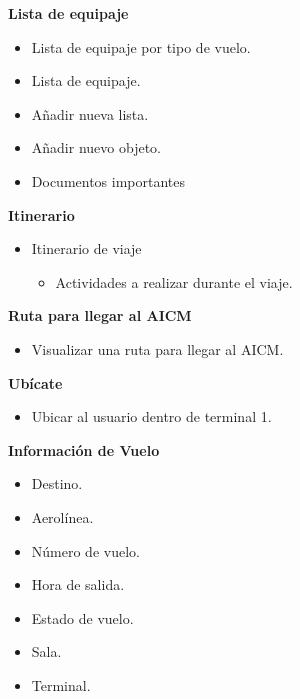 \textbf{Lista de equipaje}

\begin{itemize}
	\item 	Lista de equipaje por tipo de vuelo.
	\item Lista de equipaje.
	\item Añadir nueva lista.
	\item Añadir nuevo objeto.
	\item Documentos importantes
\end{itemize}
	
\textbf{Itinerario}

\begin{itemize}
	\item Itinerario de viaje
	\begin{itemize}
	 \item Actividades a realizar durante el viaje.
	\end{itemize}
\end{itemize}

\textbf{Ruta para llegar al AICM}

\begin{itemize}
	\item Visualizar una ruta para llegar al AICM.
\end{itemize}

\textbf{Ubícate}

\begin{itemize}
	\item Ubicar al usuario dentro de terminal 1.
\end{itemize} 

\textbf{Información de Vuelo}

\begin{itemize}
	\item Destino.
	\item Aerolínea.
	\item Número de vuelo.
	\item Hora de salida.
	\item Estado de vuelo.
	\item Sala.
	\item Terminal.
\end{itemize}

